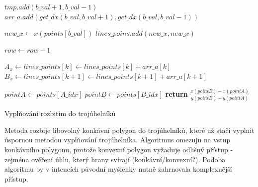 \documentclass[a4paper,12pt]{book}
\begin{document}
\begin{algorithm}
\begin{algorithmic}
	  	
	  	\State $tmp.add(b\_val+1,b\_val-1)$
	  	\State $arr\_a.add(get\_dx(b\_val,b\_val+1),get\_dx(b\_val,b\_val-1))$
	  	
	  	\State $new\_x \gets x(points[b\_val])$
	  	\State $lines\_poins.add(new\_x, new\_x)$
\EndIf
\EndFor


	\State $row \gets row-1$

	\State $A_x \gets lines\_points[k] \gets lines\_points[k] + arr\_a[k]$
	\State $B_x \gets lines\_points[k+1] \gets lines\_points[k+1] + arr\_a[k+1]$
	\\
	\EndFor	
\EndFor


\EndFor


\EndFor
\EndFunction

    \State $pointA \gets points[A\_idx]$
    \State $pointB \gets points[B\_idx]$
    \State \textbf{return} $\frac{x(pointB)-x(pointA)}{y(pointB)-y(pointA)}$
\EndFunction


\end{algorithmic}
\end{algorithm}








Vyplňování rozbitím do trojúhelníků

Metoda rozbije libovolný konkávní polygon do trojúhelníků, které už stačí vyplnit úspornou metodou vyplňování trojúhelníka.
Algoritmus omezuju na vstup konkávního polygonu, protože konvexní polygon vyžaduje odlišný přístup - zejména ověření úhlu, který hrany svírají (konkávní/konvexní?). Podoba algoritmu by v intencích původní myšlenky nutně zahrnovala komplexnější přístup.




\end{document}
